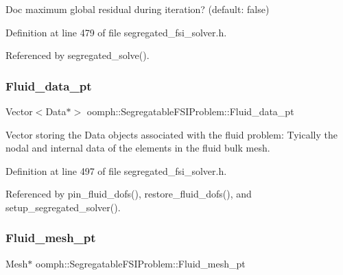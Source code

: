 Doc maximum global residual during iteration? (default\+: false) 



Definition at line 479 of file segregated\+\_\+fsi\+\_\+solver.\+h.



Referenced by segregated\+\_\+solve().

\mbox{\label{classoomph_1_1SegregatableFSIProblem_a1aac015f9f0e9c1b925a534278dc1e55}} 
\subsubsection{\texorpdfstring{Fluid\+\_\+data\+\_\+pt}{Fluid\_data\_pt}}
{\footnotesize\ttfamily Vector$<$Data$\ast$$>$ oomph\+::\+Segregatable\+F\+S\+I\+Problem\+::\+Fluid\+\_\+data\+\_\+pt\hspace{0.3cm}{\ttfamily [protected]}}



Vector storing the Data objects associated with the fluid problem\+: Tyically the nodal and internal data of the elements in the fluid bulk mesh. 



Definition at line 497 of file segregated\+\_\+fsi\+\_\+solver.\+h.



Referenced by pin\+\_\+fluid\+\_\+dofs(), restore\+\_\+fluid\+\_\+dofs(), and setup\+\_\+segregated\+\_\+solver().

\mbox{\label{classoomph_1_1SegregatableFSIProblem_ada29fa4ef2ae7b6460887f8f04eba6bf}} 
\subsubsection{\texorpdfstring{Fluid\+\_\+mesh\+\_\+pt}{Fluid\_mesh\_pt}}
{\footnotesize\ttfamily Mesh$\ast$ oomph\+::\+Segregatable\+F\+S\+I\+Problem\+::\+Fluid\+\_\+mesh\+\_\+pt\hspace{0.3cm}{\ttfamily [protected]}}



